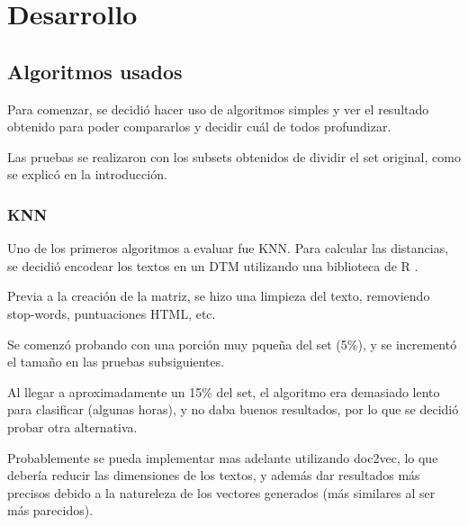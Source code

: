 
\chapter{Desarrollo} %

\label{Desarrollo} %


\section{Algoritmos usados}

Para comenzar, se decidió hacer uso de algoritmos simples y ver el resultado obtenido para poder
compararlos y decidir cuál de todos profundizar.

Las pruebas se realizaron con los subsets obtenidos de dividir el set original, como se explicó en
la introducción.

\subsection{KNN}

Uno de los primeros algoritmos a evaluar fue KNN. Para calcular las distancias, se decidió encodear
los textos en un DTM utilizando una biblioteca de R \cite{dtm_for_sentiment_analysis}.

Previa a la creación de la matriz, se hizo una limpieza del texto, removiendo stop-words, puntuaciones
HTML, etc.

Se comenzó probando con una porción muy pqueña del set (5\%), y se incrementó el tamaño en las pruebas
subsiguientes.

Al llegar a aproximadamente un 15\% del set, el algoritmo era demasiado lento para clasificar (algunas
horas), y no daba buenos resultados, por lo que se decidió probar otra alternativa.

Probablemente se pueda implementar mas adelante utilizando doc2vec, lo que debería reducir las
dimensiones de los textos, y además dar resultados más precisos debido a la natureleza de los
vectores generados (más similares al ser más parecidos).

